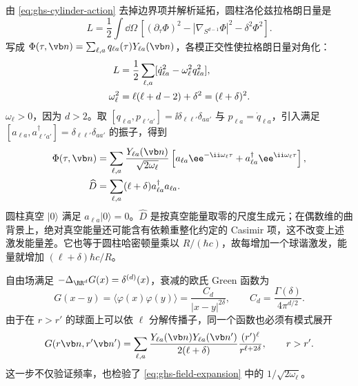 由 \cref{eq:ghs-cylinder-action} 去掉边界项并解析延拓，圆柱洛伦兹拉格朗日量是
\begin{equation*}
 L=\frac12\int\dd\Omega\,
 \left[(\partial_\tau\Phi)^2-|\nabla_{S^{d-1}}\Phi|^2-\delta^2\Phi^2\right].
\end{equation*}
写成 $\Phi(\tau,\vb n)=\sum_{\ell,a}q_{\ell a}(\tau)Y_{\ell a}(\vb n)$，各模正交性使拉格朗日量对角化：
\begin{align}\label{eq:ghs-harmonic-oscillators}
 L&=\frac12\sum_{\ell,a}[\dot q_{\ell a}^2-\omega_\ell^2q_{\ell a}^2],\\
 \omega_\ell^2&=\ell(\ell+d-2)+\delta^2=(\ell+\delta)^2.\notag
\end{align}
$\omega_\ell>0$，因为 $d>2$。取 $[q_{\ell a},p_{\ell'a'}]=\ii\delta_{\ell\ell'}\delta_{aa'}$ 与 $p_{\ell a}=\dot q_{\ell a}$，引入满足 $[a_{\ell a},a_{\ell'a'}^\dagger]=\delta_{\ell\ell'}\delta_{aa'}$ 的振子，得到
\begin{align}\label{eq:ghs-field-expansion}
 \Phi(\tau,\vb n)&=\sum_{\ell,a}\frac{Y_{\ell a}(\vb n)}{\sqrt{2\omega_\ell}}
 \left[a_{\ell a}\ee^{-\ii\omega_\ell\tau}+a_{\ell a}^\dagger\ee^{\ii\omega_\ell\tau}\right],\\
 \widehat D&=\sum_{\ell,a}(\ell+\delta)a_{\ell a}^\dagger a_{\ell a}.
 \label{eq:ghs-dimension-operator}
\end{align}
圆柱真空 $|0\rangle$ 满足 $a_{\ell a}|0\rangle=0$。$\widehat D$ 是按真空能量取零的尺度生成元；在偶数维的曲背景上，绝对真空能量还可能含有依赖重整化约定的 Casimir 项，这不改变上述激发能量差。它也等于圆柱哈密顿量乘以 $R/(\hbar c)$，故每增加一个球谐激发，能量就增加 $(\ell+\delta)\hbar c/R$。


自由场满足 $-\Delta_{\RR^d}G(x)=\delta^{(d)}(x)$，衰减的欧氏 Green 函数为
\begin{equation}\label{eq:ghs-propagator}
 G(x-y)=\langle\varphi(x)\varphi(y)\rangle
 =\frac{C_d}{|x-y|^{2\delta}},\qquad
 C_d=\frac{\Gamma(\delta)}{4\pi^{d/2}}.
\end{equation}
由于在 $r>r'$ 的球面上可以依 $\ell$ 分解传播子，同一个函数也必须有模式展开
\begin{equation}\label{eq:ghs-propagator-modes}
 G(r\vb n,r'\vb n')=\sum_{\ell,a}\frac{Y_{\ell a}(\vb n)Y_{\ell a}(\vb n')}{2(\ell+\delta)}
 \frac{(r')^\ell}{r^{\ell+2\delta}},\qquad r>r'.
\end{equation}
这一步不仅验证频率，也检验了 \cref{eq:ghs-field-expansion} 中的 $1/\sqrt{2\omega_\ell}$。


